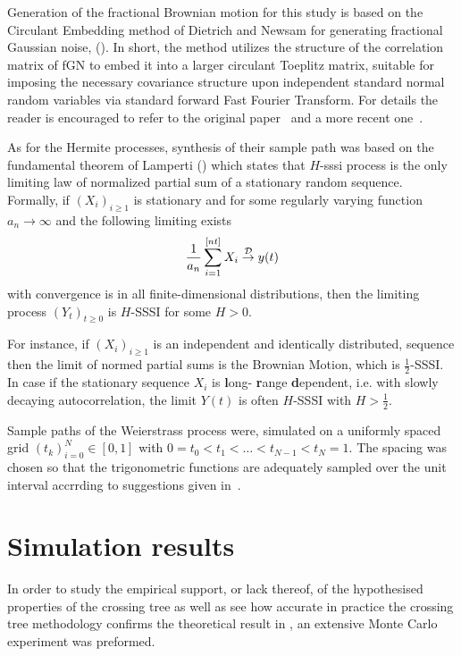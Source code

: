 Generation of the fractional Brownian motion for this study is based on the Circulant
Embedding method of Dietrich and Newsam for generating fractional Gaussian noise,
(\cite{WRCR:WRCR6232}). In short, the method utilizes the structure of the correlation
matrix of fGN to embed it into a larger circulant Toeplitz matrix, suitable for
imposing the necessary covariance structure upon independent standard normal random
variables via standard forward Fast Fourier Transform. For details the reader is
encouraged to refer to the original paper~\cite{WRCR:WRCR6232} and a more recent
one~\cite{Perrin:1058211}.

As for the Hermite processes, synthesis of their sample path was based on the fundamental
theorem of Lamperti (\cite{lamperti}) which states that $H$-sssi process is the only 
limiting law of normalized partial sum of a stationary random sequence. Formally,
if $(X_i)_{i\geq1}$ is stationary and for some regularly varying function $a_n\to \infty$
and the following limiting exists
\[ \frac{1}{a_n} \sum_{i=1}^{[nt]} X_i \overset{\mathcal{D}}{\rightarrow} y(t) \]
with convergence is in all finite-dimensional distributions, then the limiting
process $(Y_t)_{t\geq0}$ is $H$-SSSI for some $H>0$.

For instance, if $(X_i)_{i\geq 1}$ is an independent and identically distributed,
sequence then the limit of normed partial sums is the Brownian Motion, which is
$\frac{1}{2}$-SSSI. In case if the stationary sequence $X_i$ is \textbf{l}ong-
\textbf{r}ange \textbf{d}ependent, i.e. with slowly decaying autocorrelation,
the limit $Y(t)$ is often $H$-SSSI with $H>\frac{1}{2}$.

Sample paths of the Weierstrass process were, simulated on a uniformly spaced grid
$(t_k)_{i=0}^N\in [0,1]$ with $0 = t_0< t_1 < \ldots < t_{N-1} < t_N = 1$. The spacing
was chosen so that the trigonometric functions are adequately sampled over the unit interval
accrrding to suggestions given in~\cite{decrouez2013estimation}.


\section{Simulation results} %
\label{sec:results}

In order to study the empirical support, or lack thereof, of the hypothesised properties
of the crossing tree as well as see how accurate in practice the crossing tree methodology
confirms the theoretical result in \cite{ECP1673}, an extensive Monte Carlo experiment
was preformed.

